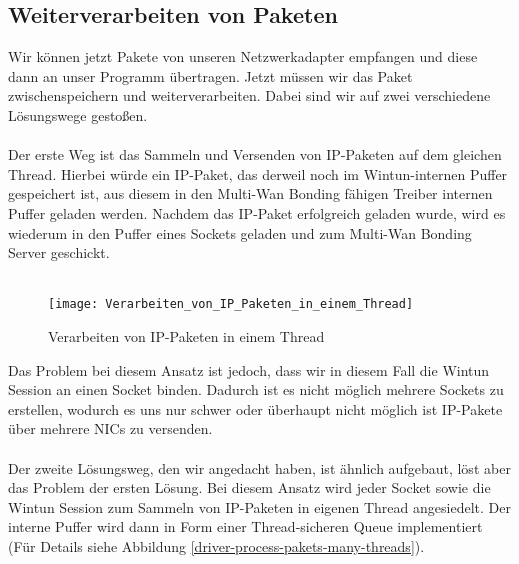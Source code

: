 \newpage

\subsection{Weiterverarbeiten von Paketen}
Wir können jetzt Pakete von unseren Netzwerkadapter empfangen und diese dann an unser Programm übertragen. Jetzt müssen wir das Paket zwischenspeichern und weiterverarbeiten. Dabei sind wir auf zwei verschiedene Lösungswege gestoßen.
\\\\
Der erste Weg ist das Sammeln und Versenden von IP-Paketen auf dem gleichen Thread. Hierbei würde ein IP-Paket, das derweil noch im Wintun-internen Puffer gespeichert ist, aus diesem in den Multi-Wan Bonding fähigen Treiber internen Puffer geladen werden. Nachdem das IP-Paket erfolgreich geladen wurde, wird es wiederum in den Puffer eines Sockets geladen und zum Multi-Wan Bonding Server geschickt. 
\\\\
\begin{figure}[H]
    \centering
    \texttt{[image: Verarbeiten\_von\_IP\_Paketen\_in\_einem\_Thread]}
    \caption[Verarbeiten von IP-Paketen in einem Thread]{Verarbeiten von IP-Paketen in einem Thread}
    \label{driver-process-pakets-one-thread}
\end{figure}
\noindent
Das Problem bei diesem Ansatz ist jedoch, dass wir in diesem Fall die Wintun Session an einen Socket binden. Dadurch ist es nicht möglich mehrere Sockets zu erstellen, wodurch es uns nur schwer oder überhaupt nicht möglich ist IP-Pakete über mehrere NICs zu versenden. 
\\\\
Der zweite Lösungsweg, den wir angedacht haben, ist ähnlich aufgebaut, löst aber das Problem der ersten Lösung. Bei diesem Ansatz wird jeder Socket sowie die Wintun Session zum Sammeln von IP-Paketen in eigenen Thread angesiedelt. Der interne Puffer wird dann in Form einer Thread-sicheren Queue implementiert (Für Details siehe Abbildung \ref{driver-process-pakets-many-threads}).

\newpage


